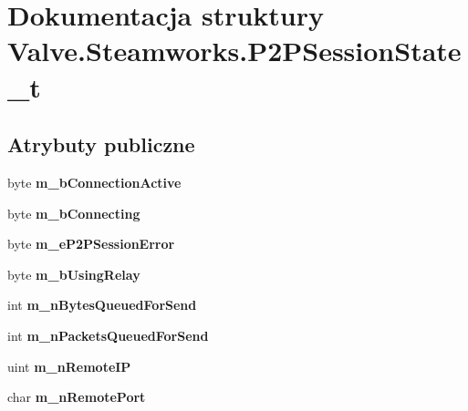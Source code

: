 \hypertarget{struct_valve_1_1_steamworks_1_1_p2_p_session_state__t}{}\section{Dokumentacja struktury Valve.\+Steamworks.\+P2\+P\+Session\+State\+\_\+t}
\label{struct_valve_1_1_steamworks_1_1_p2_p_session_state__t}
\subsection*{Atrybuty publiczne}
\begin{DoxyCompactItemize}
\item 
\mbox{\label{struct_valve_1_1_steamworks_1_1_p2_p_session_state__t_a9d6e5ad8c180a7b202c8e4a2b4baa8d3}} 
byte {\bfseries m\+\_\+b\+Connection\+Active}
\item 
\mbox{\label{struct_valve_1_1_steamworks_1_1_p2_p_session_state__t_a50df4e00ce757c7b6e94b06989de379e}} 
byte {\bfseries m\+\_\+b\+Connecting}
\item 
\mbox{\label{struct_valve_1_1_steamworks_1_1_p2_p_session_state__t_a514aa661445b97f0c8e4a86f98627358}} 
byte {\bfseries m\+\_\+e\+P2\+P\+Session\+Error}
\item 
\mbox{\label{struct_valve_1_1_steamworks_1_1_p2_p_session_state__t_a28f464f7554d10500d3efe16d823912a}} 
byte {\bfseries m\+\_\+b\+Using\+Relay}
\item 
\mbox{\label{struct_valve_1_1_steamworks_1_1_p2_p_session_state__t_a055d28af4e56e2cd68cd74b81a941c8e}} 
int {\bfseries m\+\_\+n\+Bytes\+Queued\+For\+Send}
\item 
\mbox{\label{struct_valve_1_1_steamworks_1_1_p2_p_session_state__t_ac56e1f6d4a10f75a9c58a045f8f4d34c}} 
int {\bfseries m\+\_\+n\+Packets\+Queued\+For\+Send}
\item 
\mbox{\label{struct_valve_1_1_steamworks_1_1_p2_p_session_state__t_abbd40b1294c090e707022774bf9c2e2c}} 
uint {\bfseries m\+\_\+n\+Remote\+IP}
\item 
\mbox{\label{struct_valve_1_1_steamworks_1_1_p2_p_session_state__t_a9b9b31010bd88725272f8a39aa3b790f}} 
char {\bfseries m\+\_\+n\+Remote\+Port}
\end{DoxyCompactItemize}


